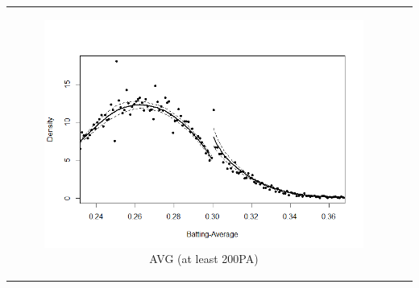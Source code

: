 \documentclass[dvipdfmx, 12pt]{article}
\begin{document}
\begin{tabular}{cc}
  \begin{minipage}[H]{0.4\textwidth}

    \begin{figure}[H]
      \centering
      \includegraphics[keepaspectratio, scale = 0.5, angle = 90]
      {graphs/AVG_300.png}
      \caption{AVG (at least 200PA)}
      \label{AVG_300}
    \end{figure}
  \end{minipage} &



  \begin{minipage}[H]{0.4\textwidth}


\end{minipage}
\end{tabular}
\end{document}

